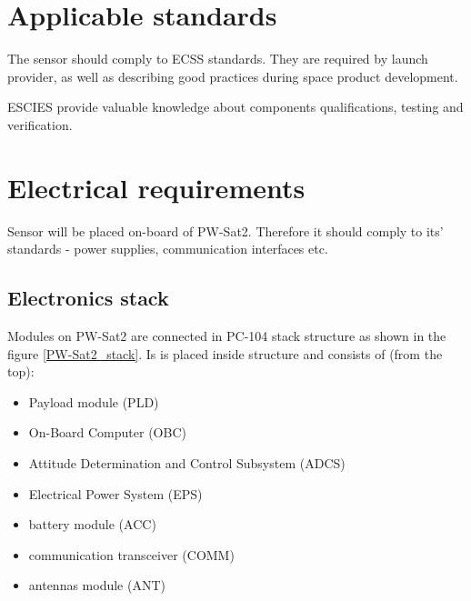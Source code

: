 \section{Applicable standards}
    The sensor should comply to ECSS \cite{ECSS_URL} standards. They are required by launch provider, as well as describing good practices during space product development.

    ESCIES \cite{ESCIES_URL} provide valuable knowledge about components qualifications, testing and verification.

\section{Electrical requirements}
    Sensor will be placed on-board of PW-Sat2. Therefore it should comply to its' standards - power supplies, communication interfaces etc.

    \subsection{Electronics stack}
        Modules on PW-Sat2 are connected in PC-104 stack structure as shown in the figure \ref{PW-Sat2_stack}. Is is placed inside structure and consists of (from the top):
        \begin{itemize}
            \item Payload module (PLD)
            \item On-Board Computer (OBC)
            \item Attitude Determination and Control Subsystem (ADCS)
            \item Electrical Power System (EPS)
            \item battery module (ACC)
            \item communication transceiver (COMM)
            \item antennas module (ANT)
        \end{itemize}

